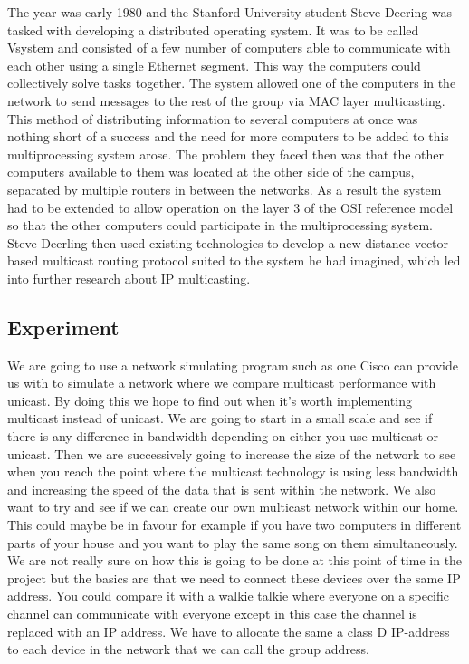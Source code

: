 \documentclass[9pt,a4paper]{acmproc}
\begin{document}
The year was early 1980 and the Stanford University student Steve Deering was tasked with developing a distributed operating system. It was to be called Vsystem and consisted of a few number of computers able to communicate with each other using a single Ethernet segment. This way the computers could collectively solve tasks together. The system allowed one of the computers in the network to send messages to the rest of the group via MAC layer multicasting. This method of distributing information to several computers at once was nothing short of a success and the need for more computers to be added to this multiprocessing system arose. The problem they faced then was that the other computers available to them was located at the other side of the campus, separated by multiple routers in between the networks. As a result the system had to be extended to allow operation on the layer 3 of the OSI reference model so that the other computers could participate in the multiprocessing system. Steve Deerling then used existing technologies to develop a new distance vector-based multicast routing protocol suited to the system he had imagined, which led into further research about IP multicasting. \cite[s.~7]{briefHist}


\subsection{Experiment}

We are going to use a network simulating program such as one Cisco can provide us with to simulate a network where we compare multicast performance with unicast. By doing this we hope to find out when it's worth implementing multicast instead of unicast. We are going to start in a small scale and see if there is any difference in bandwidth depending on either you use multicast or unicast. Then we are successively going to increase the size of the network to see when you reach the point where the multicast technology is using less bandwidth and increasing the speed of the data that is sent within the network.
We also want to try and see if we can create our own multicast network within our home. This could maybe be in favour for example if you have two computers in different parts of your house and you want to play the same song on them simultaneously. We are not really sure on how this is going to be done at this point of time in the project but the basics are that we need to connect these devices over the same IP address. You could compare it with a walkie talkie where everyone on a specific channel can communicate with everyone except in this case the channel is replaced with an IP address. We have to allocate the same a class D IP-address to each device in the network that we can call the group address.
\end{document}
